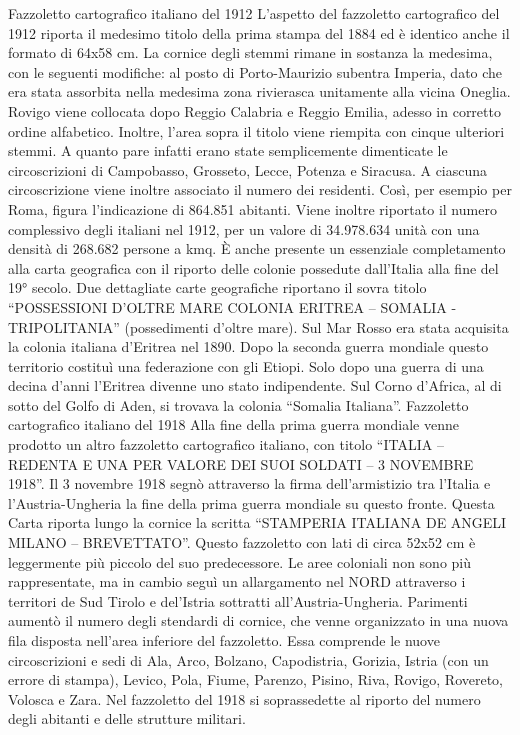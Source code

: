 Fazzoletto cartografico italiano del 1912
   L’aspetto del fazzoletto cartografico del 1912 riporta il medesimo titolo della prima stampa del 1884 ed è identico anche il formato di 64x58 cm. La cornice degli stemmi rimane in sostanza la medesima, con le seguenti modifiche: al posto di Porto-Maurizio subentra Imperia, dato che era stata assorbita nella medesima zona rivierasca unitamente alla vicina Oneglia. Rovigo viene collocata dopo Reggio Calabria e Reggio Emilia, adesso in corretto ordine alfabetico. Inoltre, l’area sopra il titolo viene riempita con cinque ulteriori stemmi. A quanto pare infatti erano state semplicemente dimenticate le circoscrizioni di Campobasso, Grosseto, Lecce, Potenza e Siracusa.
   A ciascuna circoscrizione viene inoltre associato il numero dei residenti. Così, per esempio per Roma, figura l’indicazione di 864.851 abitanti.  Viene  inoltre  riportato  il numero complessivo degli italiani nel 1912, per un valore di 34.978.634 unità con una densità di 268.682 persone a kmq.
   È anche presente un essenziale completamento alla carta geografica con il riporto delle colonie possedute dall’Italia alla fine del 19° secolo. Due dettagliate carte geografiche riportano il sovra titolo “POSSESSIONI D’OLTRE MARE COLONIA ERITREA – SOMALIA - TRIPOLITANIA” (possedimenti d’oltre mare). Sul Mar Rosso era stata acquisita la colonia italiana d’Eritrea nel 1890. Dopo la seconda guerra mondiale questo territorio costituì una federazione con gli Etiopi. Solo dopo una guerra di una decina d’anni l’Eritrea divenne uno stato indipendente.   Sul Corno d’Africa, al di sotto del Golfo di Aden, si trovava la colonia “Somalia Italiana”.  
Fazzoletto cartografico italiano del 1918
   Alla fine della prima guerra mondiale venne prodotto un altro fazzoletto cartografico italiano, con titolo “ITALIA – REDENTA E UNA PER VALORE DEI SUOI SOLDATI – 3 NOVEMBRE 1918”. Il 3 novembre 1918 segnò attraverso la firma dell’armistizio tra l’Italia e l’Austria-Ungheria la fine della prima guerra mondiale su questo fronte.
   Questa Carta riporta lungo la cornice la scritta “STAMPERIA ITALIANA DE ANGELI MILANO – BREVETTATO”. Questo fazzoletto con lati di circa 52x52 cm è leggermente più piccolo del suo predecessore. Le aree coloniali  non  sono  più  rappresentate, ma in cambio seguì un allargamento nel NORD attraverso i territori de Sud Tirolo e del’Istria sottratti all’Austria-Ungheria.  
   Parimenti aumentò il numero degli stendardi di cornice, che venne organizzato in una nuova fila disposta nell’area inferiore del fazzoletto. Essa comprende le nuove circoscrizioni e sedi di Ala, Arco, Bolzano, Capodistria, Gorizia, Istria (con un errore di stampa), Levico, Pola, Fiume, Parenzo, Pisino, Riva, Rovigo, Rovereto, Volosca e Zara. Nel fazzoletto del 1918 si soprassedette al riporto del numero degli abitanti e delle strutture militari. 

